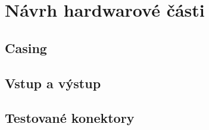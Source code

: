 
\section{Návrh hardwarové části}
\subsection{Casing}
\subsection{Vstup a výstup}
\subsection{Testované konektory}